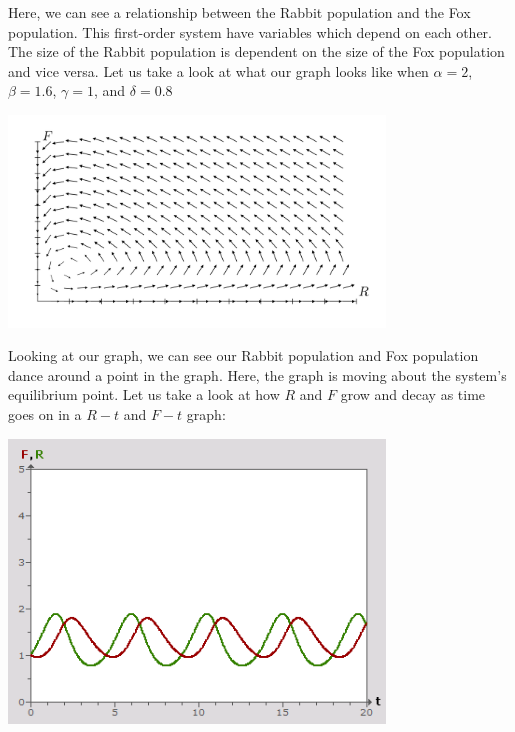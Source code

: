 \documentclass{amsart}
\theoremstyle{definition}
\numberwithin{equation}{section}
\begin{document}
\begin{sansmath}
Here, we can see a relationship between the Rabbit population and the Fox population. This first-order system have variables which depend on each other. The size of the Rabbit population is dependent on the size of the Fox population and vice versa.
Let us take a look at what our graph looks like when $\alpha = 2$, $\beta = 1.6$, $\gamma = 1$, and $\delta = 0.8$

\begin{center}
  \includegraphics[width=10cm]{PredatorPreyModel}
\end{center}


Looking at our graph, we can see our Rabbit population and Fox population dance around a point in the graph. Here, the graph is moving about the system's equilibrium point. Let us take a look at how $R$ and $F$ grow and decay as time goes on in a $R-t$ and $F-t$ graph:

\begin{center}
  \includegraphics[width=10cm]{RT Graph}
\end{center}


\end{sansmath}
\end{document}
